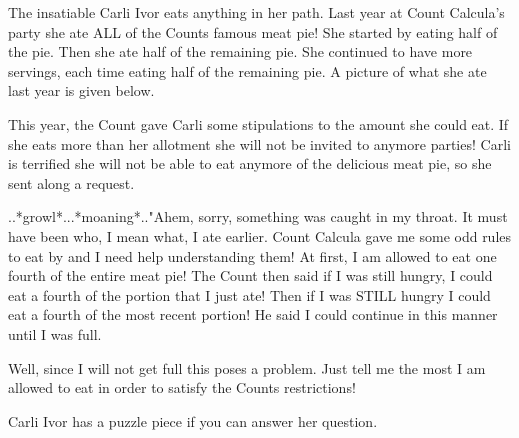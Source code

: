 




{The insatiable Carli Ivor eats anything in her path. Last year at Count Calcula's party she ate ALL of the Counts famous meat pie! She started by eating half of the pie. Then she ate half of the remaining pie. She continued to have more servings, each time eating half of the remaining pie. A picture of what she ate last year is given below.

This year, the Count gave Carli some stipulations to the amount she could eat. If she eats more than her allotment she will not be invited to anymore parties! Carli is terrified she will not be able to eat anymore of the delicious meat pie, so she sent along a request.}

   {..*growl*...*moaning*.."Ahem, sorry, something was caught in my throat. It must have been who, I mean what, I ate earlier. Count Calcula gave me some odd rules to eat by and I need help understanding them! At first, I am allowed to eat one fourth of the entire meat pie! The Count then said if I was still hungry, I could eat a fourth of the portion that I just ate! Then if I was STILL hungry I could eat a fourth of the most recent portion! He said I could continue in this manner until I was full. }

    {Well, since I will not get full this poses a problem. Just tell me the most I am allowed to eat in order to satisfy the Counts restrictions!}

 {Carli Ivor has a puzzle piece if you can answer her question.}

